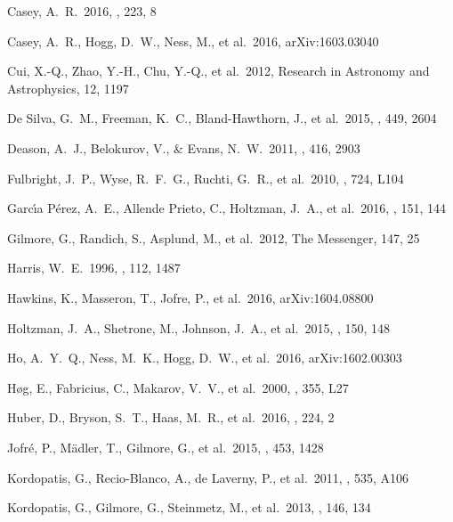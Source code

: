 \documentclass[preprint,trackchanges]{aastex}
\begin{document}
\begin{thebibliography}{dummy}
 Casey, A.~R.\ 2016, \apjs, 223, 8 

 Casey, A.~R., Hogg, D.~W., Ness, M., et al.\ 2016, arXiv:1603.03040 

 Cui, X.-Q., Zhao, Y.-H., Chu, Y.-Q., et al.\ 2012, Research in Astronomy and Astrophysics, 12, 1197 

 De Silva, G.~M., Freeman, K.~C., Bland-Hawthorn, J., et al.\ 2015, \mnras, 449, 2604 

 Deason, A.~J., Belokurov, V., \& Evans, N.~W.\ 2011, \mnras, 416, 2903 

 Fulbright, J.~P., Wyse, R.~F.~G., Ruchti, G.~R., et al.\ 2010, \apjl, 724, L104 

 Garc{\'{\i}}a P{\'e}rez, A.~E., Allende Prieto, C., Holtzman, J.~A., et al.\ 2016, \aj, 151, 144 

 Gilmore, G., Randich, S., Asplund, M., et al.\ 2012, The Messenger, 147, 25

 Harris, W.~E.\ 1996, \aj, 112, 1487 

 Hawkins, K., Masseron, T., Jofre, P., et al.\ 2016, arXiv:1604.08800 

 Holtzman, J.~A., Shetrone, M., Johnson, J.~A., et al.\ 2015, \aj, 150, 148 

 Ho, A.~Y.~Q., Ness, M.~K., Hogg, D.~W., et al.\ 2016, arXiv:1602.00303 
 
 H{\o}g, E., Fabricius, C., Makarov, V.~V., et al.\ 2000, \aap, 355, L27 

 Huber, D., Bryson, S.~T., Haas, M.~R., et al.\ 2016, \apjs, 224, 2 

 Jofr{\'e}, P., M{\"a}dler, T., Gilmore, G., et al.\ 2015, \mnras, 453, 1428 

 Kordopatis, G., Recio-Blanco, A., de Laverny, P., et al.\ 2011, \aap, 535, A106 

 Kordopatis, G., Gilmore, G., Steinmetz, M., et al.\ 2013, \aj, 146, 134 


\end{thebibliography}
\end{document}
